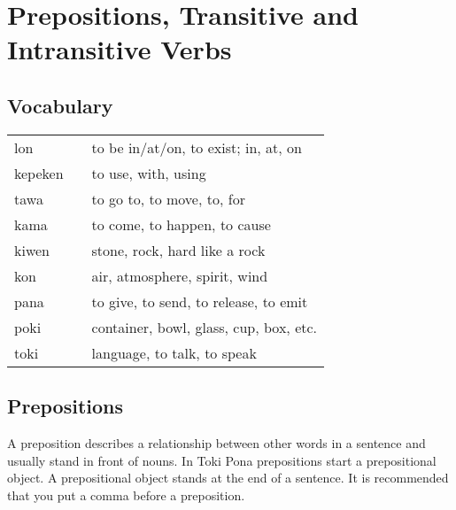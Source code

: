 \section{Prepositions, Transitive and Intransitive Verbs}
\subsection*{Vocabulary}
%
\begin{supertabular}{p{5,5cm}|ll}
lon && to be in/at/on, to exist; in, at, on \\
kepeken && to use, with, using \\
tawa && to go to, to move, to, for \\
kama && to come, to happen, to cause  \\         
kiwen && stone, rock, hard like a rock \\
kon && air, atmosphere, spirit, wind \\
pana && to give, to send, to release, to emit \\
poki && container, bowl, glass, cup, box, etc. \\
toki && language, to talk, to speak \\
\end{supertabular}  
%
\subsection*{Prepositions}
%
A preposition describes a relationship between other words in a sentence  and usually stand in front of nouns. 
In Toki Pona prepositions start a prepositional object. 
A prepositional object stands at the end of a sentence. 
It is recommended that you put a comma before a preposition.
%
